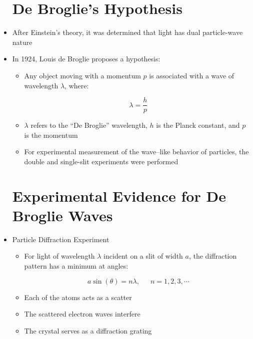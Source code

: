 \begin{itemize}

    \section{De Broglie's Hypothesis}

  \item After Einstein's theory, it was determined that light has dual particle-wave nature

  \item In 1924, Louis de Broglie proposes a hypothesis:

    \begin{itemize}

      \item Any object moving with a momentum $p$ is associated with a wave of wavelength $\lambda$, where:

        $$\boxed{\lambda=\frac{h}{p}}$$

      \item $\lambda$ refers to the ``De Broglie'' wavelength, $h$ is the Planck constant, and $p$ is the momentum

      \item For experimental measurement of the wave--like behavior of particles, the double and single-slit experiments were performed

    \end{itemize}

    \section{Experimental Evidence for De Broglie Waves}

  \item Particle Diffraction Experiment

    \begin{itemize}

      \item For light of wavelength $\lambda$ incident on a slit of width $a$, the diffraction pattern has a minimum at angles:

        $$\boxed{a\sin(\theta)=n\lambda,\,\,\,\,\,\,\,\,\, n=1,2,3,\cdots}$$

      \item Each of the atoms acts as a scatter

      \item The scattered electron waves interfere

      \item The crystal serves as a diffraction grating


\end{itemize}
\end{itemize}
